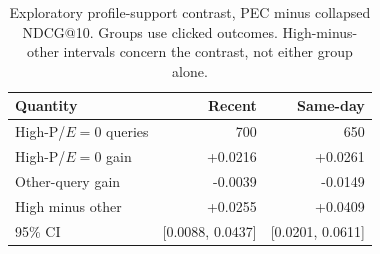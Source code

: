 \begin{table}[t]
\renewcommand{\arraystretch}{1.10}
\caption{Exploratory profile-support contrast, PEC minus collapsed NDCG@10. Groups use clicked outcomes. High-minus-other intervals concern the contrast, not either group alone.}\label{tab:profile_contrast}
\centering\small
\begin{tabular*}{\linewidth}{@{\extracolsep{\fill}}lrr@{}}\toprule
Quantity & Recent & Same-day\\\midrule
High-P/$E=0$ queries & 700 & 650\\
High-P/$E=0$ gain & +0.0216 & +0.0261\\
Other-query gain & -0.0039 & -0.0149\\
High minus other & +0.0255 & +0.0409\\
95\% CI & [0.0088, 0.0437] & [0.0201, 0.0611]\\\bottomrule
\end{tabular*}\end{table}
